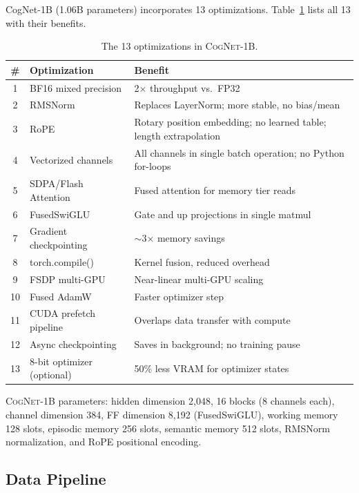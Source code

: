 \documentclass[11pt]{article}
\newcommand{\cognet}{\textsc{CogNet}}
\begin{document}
CogNet-1B (1.06B parameters) incorporates 13 optimizations. Table~\ref{tab:optimizations} lists all 13 with their benefits.

\begin{table}[htbp]
\centering
\caption{The 13 optimizations in \cognet{}-1B.}
\label{tab:optimizations}
\begin{tabular}{@{}clp{6.5cm}@{}}
\toprule
\textbf{\#} & \textbf{Optimization} & \textbf{Benefit} \\
\midrule
1  & BF16 mixed precision      & 2$\times$ throughput vs.\ FP32 \\
2  & RMSNorm                   & Replaces LayerNorm; more stable, no bias/mean \\
3  & RoPE                      & Rotary position embedding; no learned table; length extrapolation \\
4  & Vectorized channels       & All channels in single batch operation; no Python for-loops \\
5  & SDPA/Flash Attention      & Fused attention for memory tier reads \\
6  & FusedSwiGLU               & Gate and up projections in single matmul \\
7  & Gradient checkpointing    & $\sim$3$\times$ memory savings \\
8  & torch.compile()           & Kernel fusion, reduced overhead \\
9  & FSDP multi-GPU            & Near-linear multi-GPU scaling \\
10 & Fused AdamW               & Faster optimizer step \\
11 & CUDA prefetch pipeline    & Overlaps data transfer with compute \\
12 & Async checkpointing       & Saves in background; no training pause \\
13 & 8-bit optimizer (optional) & 50\% less VRAM for optimizer states \\
\bottomrule
\end{tabular}
\end{table}

\cognet{}-1B parameters: hidden dimension 2{,}048, 16 blocks (8 channels each), channel dimension 384, FF dimension 8{,}192 (FusedSwiGLU), working memory 128 slots, episodic memory 256 slots, semantic memory 512 slots, RMSNorm normalization, and RoPE positional encoding.

\subsection{Data Pipeline}
\label{sec:cognet:data}
\end{document}
